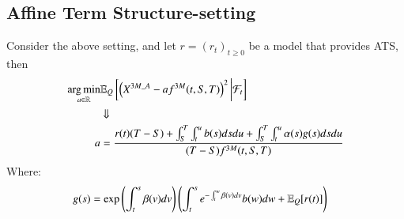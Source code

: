 \newpage 

\subsection{Affine Term Structure-setting}

\begin{proposition}
Consider the above setting, and let $r = (r_{t})_{t\geq 0}$ be a model that provides ATS, then 
\begin{align*}
\operatorname*{arg\,min}\limits_{a \in \mathbb{R}}&\mathbb{E}_{Q}\left[
\left(
X^{3M\_A}- af^{3M}(t,S,T)
\right)^{2}
\bigg{|}\mathcal{F}_{t}
\right] \\
&\Downarrow \\
a &= \frac{
r(t)(T-S)
+ \int_{S}^{T}\int_{t}^{u}b(s)dsdu 
+ \int_{S}^{T}\int_{t}^{u}\alpha(s)g(s)dsdu
}{
(T-S)f^{3M}(t,S,T)
}
\end{align*}
Where:
\begin{align*}
g(s) &= \exp\left(
\int_{t}^{s}\beta(v)dv
\right)
\left(
\int_{t}^{s}e^{-\int_{t}^{w}\beta(v)dv}b(w)dw + \mathbb{E}_{Q}[r(t)]
\right) 
\end{align*}
\end{proposition}

